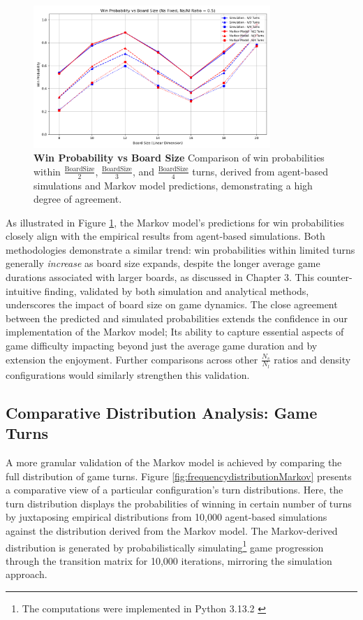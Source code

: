 \begin{figure}[th]
	\centering
	\includegraphics[width=0.8\textwidth]{"../Markov Modelling/Code/plots/plots/chapter4_validation/win_probability_plot_NsFixed_05.png"}
	\caption{\textbf{Win Probability vs Board Size} Comparison of win probabilities within $\frac{\text{BoardSize}}{2}$, $\frac{\text{BoardSize}}{3}$, and $\frac{\text{BoardSize}}{4}$ turns, derived from agent-based simulations and Markov model predictions, demonstrating a high degree of agreement.}
	\label{fig:winprobability_NsFixed_05}
\end{figure}

As illustrated in Figure \ref{fig:winprobability_NsFixed_05}, the Markov model's predictions for win probabilities closely align with the empirical results from agent-based simulations. Both methodologies demonstrate a similar trend: win probabilities within limited turns generally \textit{increase} as board size expands, despite the longer average game durations associated with larger boards, as discussed in Chapter 3.  This counter-intuitive finding, validated by both simulation and analytical methods, underscores the impact of board size on game dynamics. The close agreement between the predicted and simulated probabilities extends the confidence in our implementation of the Markov model; Its ability to capture essential aspects of game difficulty impacting beyond just the average game duration and by extension the enjoyment.  Further comparisons across other $\frac{N_s}{N_l}$ ratios and density configurations would similarly strengthen this validation.

\subsection{Comparative Distribution Analysis: Game Turns}

A more granular validation of the Markov model is achieved by comparing the full distribution of game turns. Figure \ref{fig:frequencydistributionMarkov} presents a comparative view of a particular configuration's turn distributions. Here, the turn distribution displays the probabilities of winning in certain number of turns by juxtaposing empirical distributions from 10,000 agent-based simulations against the distribution derived from the Markov model. The Markov-derived distribution is generated by probabilistically simulating\footnote{The computations were implemented in Python 3.13.2 \autocite{python}} game  progression through the transition matrix for 10,000 iterations, mirroring the simulation approach.

